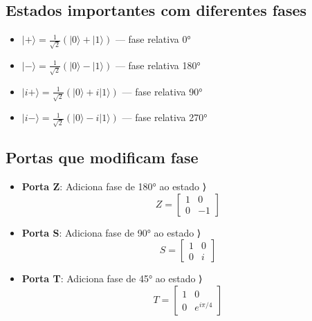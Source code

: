 \documentclass[
  brazilian,
]{report}
\providecommand{\tightlist}{%
  \setlength{\itemsep}{0pt}\setlength{\parskip}{0pt}}
\begin{document}
\subsection{Estados importantes com diferentes
fases}\label{estados-importantes-com-diferentes-fases}

\begin{itemize}
\tightlist
\item
  \(|+⟩ = \frac{1}{\sqrt{2}}(|0⟩ + |1⟩)\) --- fase relativa 0°
\item
  \(|-⟩ = \frac{1}{\sqrt{2}}(|0⟩ - |1⟩)\) --- fase relativa 180°
\item
  \(|i+⟩ = \frac{1}{\sqrt{2}}(|0⟩ + i|1⟩)\) --- fase relativa 90°
\item
  \(|i-⟩ = \frac{1}{\sqrt{2}}(|0⟩ - i|1⟩)\) --- fase relativa 270°
\end{itemize}

\subsection{Portas que modificam fase}\label{portas-que-modificam-fase}

\begin{itemize}
\item
  \textbf{Porta Z}: Adiciona fase de 180° ao estado ⟩
  \[Z = \begin{bmatrix} 1 & 0 \\ 0 & -1 \end{bmatrix}\]
\item
  \textbf{Porta S}: Adiciona fase de 90° ao estado ⟩
  \[S = \begin{bmatrix} 1 & 0 \\ 0 & i \end{bmatrix}\]
\item
  \textbf{Porta T}: Adiciona fase de 45° ao estado ⟩
  \[T = \begin{bmatrix} 1 & 0 \\ 0 & e^{i\pi/4} \end{bmatrix}\]
\end{itemize}
\end{document}
